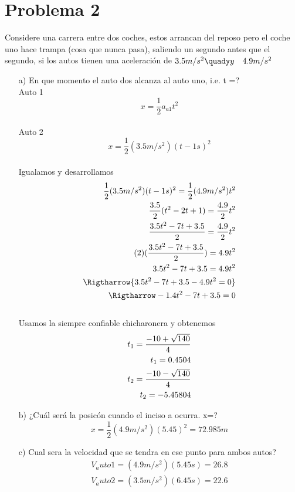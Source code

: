 \documentclass[a4paper, 12pt]{article}
\begin{document}
 \section{Problema 2}
Considere una carrera entre dos coches, estos arrancan del reposo pero el coche uno hace trampa (cosa que nunca pasa), saliendo un segundo antes que el segundo, si los autos tienen una aceleración de $3.5m/s^{2}\quady y \quad 4.9m/s^{2}$\\
\begin{enumerate}
    \item [a)]En que momento el auto dos alcanza al auto uno, i.e. t =?\\
    Auto 1
    \begin{equation}
    x= \frac{1}{2} a_{a1} t^2 
    \end{equation}\\
    Auto 2
    \begin{equation}
     x= \frac{1}{2} (3.5 m/s^2)(t-1s)^2 
     \end{equation}\\
     Igualamos y desarrollamos 
     \begin{align*}
        \frac{1}{2} (3.5 m/s^2)(t-1s)^2 = \frac{1}{2} (4.9 m/s^2)t^2\\
        \frac{3.5}{2} (t^2 - 2t + 1) = \frac{4.9}{2} t^2\\
        \frac{3.5t^2 - 7t + 3.5}{2} = \frac{4.9}{2} t^2\\
        (2)(\frac{3.5t^2 - 7t + 3.5}{2}) = 4.9t^2\\
         3.5t^2 - 7t + 3.5 = 4.9t^2\\
         \Rigtharrow{3.5t^2 - 7t + 3.5 - 4.9t^2 = 0}\\
         \Rigtharrow-1.4t^2 - 7t + 3.5  = 0
     \end{align*}\\
     Usamos la siempre confiable chicharonera y obtenemos 
     \begin{align*}
          t_1 = \frac{- 10 + \sqrt{140}}{4}\\
          t_1 = 0.4504\\
          \newline 
          t_2 = \frac{- 10 - \sqrt{140}}{4}\\
          t_2 = -5.45804
     \end{align*}
    \item [b)]¿Cuál será la posicón cuando el inciso a ocurra. x=?
       \begin{equation*}
        x= \frac{1}{2} (4.9m/s^2)(5.45)^2 = 72.985m
       \end{equation*}
    \item [c)] Cual sera la velocidad que se tendra en ese punto para ambos autos?
       \begin{align}
           V_auto1 = (4.9m/s^{2})(5.45s) = 26.8\\
           V_auto2 = (3.5m/s^2)(6.45s) = 22.6
           

\end{align}
\end{enumerate}
\end{document}
